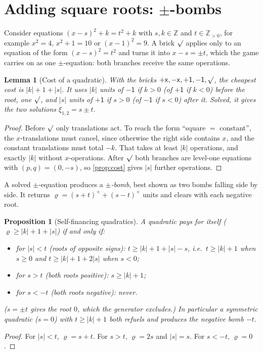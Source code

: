 \documentclass[11pt,a4paper]{article}
\newtheorem{lemma}[theorem]{Lemma}
\newtheorem{proposition}[theorem]{Proposition}
\theoremstyle{definition}
\theoremstyle{remark}
\newcommand{\Z}{\mathbb{Z}}
\newcommand{\pX}{\ensuremath{\mathord{+}\mathsf{x}}}
\newcommand{\mX}{\ensuremath{\mathord{-}\mathsf{x}}}
\newcommand{\pU}{\ensuremath{\mathord{+}\mathsf{1}}}
\newcommand{\mU}{\ensuremath{\mathord{-}\mathsf{1}}}
\newcommand{\sq}{\ensuremath{\surd}}
\newcommand{\abs}[1]{\lvert #1\rvert}
\newcommand{\pos}[1]{{#1}^{+}}
\begin{document}
\section{Adding square roots: \texorpdfstring{$\pm$}{plus-minus}-bombs}\label{sec:sqrt}

Consider equations $(x-s)^2+k=t^2+k$ with $s,k\in\Z$ and $t\in\Z_{>0}$, for example
$x^2=4$, $x^2+1=10$ or $(x-1)^2=9$. A brick $\sq$ applies only to an equation of the form
$(x-s)^2=t^2$ and turns it into $x-s=\pm t$, which the game carries on as one
$\pm$-equation: both branches receive the same operations.

\begin{lemma}[Cost of a quadratic]\label{lem:sqrtcost}
With the bricks $\pX,\mX,\pU,\mU,\sq$, the cheapest cost is $\abs k+1+\abs s$. It uses
$\abs k$ units of $\mU$ if $k>0$ (of $\pU$ if $k<0$) before the root, one $\sq$, and
$\abs s$ units of $\pU$ if $s>0$ (of $\mU$ if $s<0$) after it. Solved, it gives the two
solutions $\xi_{1,2}=s\pm t$.
\end{lemma}
\begin{proof}
Before $\sq$ only translations act. To reach the form ``square $=$ constant'', the
$x$-translations must cancel, since otherwise the right side contains $x$, and the
constant translations must total $-k$. That takes at least $\abs k$ operations, and
exactly $\abs k$ without $x$-operations. After $\sq$ both branches are level-one
equations with $(p,q)=(0,-s)$, so \cref{prop:cost} gives $\abs s$ further operations.
\end{proof}

A solved $\pm$-equation produces a \emph{$\pm$-bomb}, best shown as two bombs falling
side by side. It returns $\varrho=\pos{(s+t)}+\pos{(s-t)}$ units and clears with each
negative root.

\begin{proposition}[Self-financing quadratics]\label{prop:selffin}
A quadratic pays for itself ($\varrho\ge\abs k+1+\abs s$) if and only if:
\begin{itemize}[nosep]
\item for $\abs s<t$ (roots of opposite signs): $t\ge\abs k+1+\abs s-s$, i.e.\
  $t\ge\abs k+1$ when $s\ge0$ and $t\ge\abs k+1+2\abs s$ when $s<0$;
\item for $s>t$ (both roots positive): $s\ge\abs k+1$;
\item for $s<-t$ (both roots negative): never.
\end{itemize}
($s=\pm t$ gives the root $0$, which the generator excludes.)
In particular a symmetric quadratic ($s=0$) with $t\ge\abs k+1$ both refuels and
produces the negative bomb $-t$.
\end{proposition}
\begin{proof}
For $\abs s<t$, $\varrho=s+t$. For $s>t$, $\varrho=2s$ and $\abs s=s$. For $s<-t$,
$\varrho=0$.
\end{proof}
\end{document}
